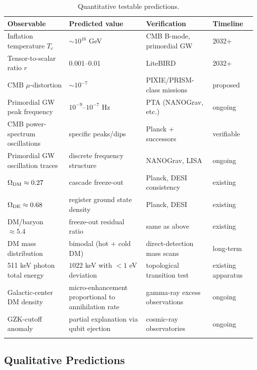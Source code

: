 \documentclass[11pt,a4paper]{article}
\begin{document}
\begin{longtable}{p{4.5cm}p{3.5cm}p{4cm}p{2cm}}
\toprule
\textbf{Observable} & \textbf{Predicted value} & \textbf{Verification} & \textbf{Timeline} \\
\midrule
Inflation temperature $T_c$ & $\sim 10^{16}$ GeV & CMB B-mode, primordial GW & 2032+ \\
Tensor-to-scalar ratio $r$ & 0.001--0.01 & LiteBIRD & 2032+ \\
CMB $\mu$-distortion & $\sim 10^{-7}$ & PIXIE/PRISM-class missions & proposed \\
Primordial GW peak frequency & $10^{-9}$--$10^{-7}$ Hz & PTA (NANOGrav, etc.) & ongoing \\
CMB power-spectrum oscillations & specific peaks/dips & Planck + successors & verifiable \\
Primordial GW oscillation traces & discrete frequency structure & NANOGrav, LISA & ongoing \\
$\Omega_{\rm DM} \approx 0.27$ & cascade freeze-out & Planck, DESI consistency & existing \\
$\Omega_{\rm DE} \approx 0.68$ & register ground state density & Planck, DESI & existing \\
DM/baryon $\approx 5.4$ & freeze-out residual ratio & same as above & existing \\
DM mass distribution & bimodal (hot + cold DM) & direct-detection mass scans & long-term \\
511 keV photon total energy & $1022$ keV with $< 1$ eV deviation & topological transition test & existing apparatus \\
Galactic-center DM density & micro-enhancement proportional to annihilation rate & gamma-ray excess observations & ongoing \\
GZK-cutoff anomaly & partial explanation via qubit ejection & cosmic-ray observatories & ongoing \\
\bottomrule
\caption{Quantitative testable predictions.}
\end{longtable}

\subsection{Qualitative Predictions}
\end{document}
